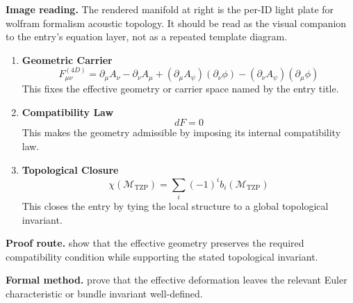 \begin{samepage}
\noindent\begin{minipage}[t]{0.45\linewidth}
\vspace{0pt}
\raggedright
\scriptsize\textbf{Image reading.} The rendered manifold at right is the per-ID light plate for wolfram formalism acoustic topology. It should be read as the visual companion to the entry's equation layer, not as a repeated template diagram.\par
\end{minipage}\hfill
\begin{minipage}[t]{0.53\linewidth}
\vspace*{-0.10in}
\raggedright
{}
\end{minipage}
\end{samepage}

\clearpage


\begin{enumerate}[leftmargin=1.6em,itemsep=9pt,topsep=6pt]
\item \textbf{Geometric Carrier}
\[
F_{\mu\nu}^{(4D)}
=
\partial_\mu A_\nu-\partial_\nu A_\mu
+(\partial_\mu A_\psi)(\partial_\nu\phi)
-(\partial_\nu A_\psi)(\partial_\mu\phi)
\]
This fixes the effective geometry or carrier space named by the entry title.

\item \textbf{Compatibility Law}
\[
dF=0
\]
This makes the geometry admissible by imposing its internal compatibility law.

\item \textbf{Topological Closure}
\[
\chi(\mathcal{M}_{\mathrm{TZP}})
=
\sum_i(-1)^i b_i(\mathcal{M}_{\mathrm{TZP}})
\]
This closes the entry by tying the local structure to a global topological invariant.
\end{enumerate}

\textbf{Proof route.} show that the effective geometry preserves the required compatibility condition while supporting the stated topological invariant.

\textbf{Formal method.} prove that the effective deformation leaves the relevant Euler characteristic or bundle invariant well-defined.

\medskip
{}


